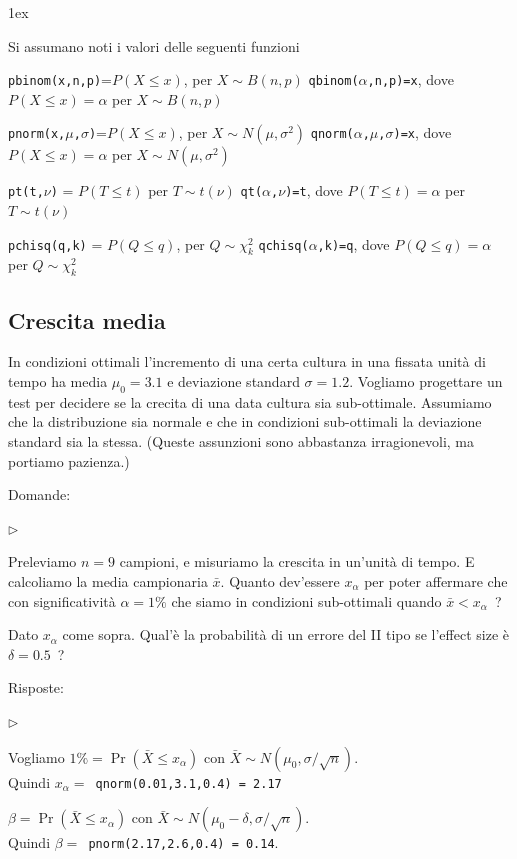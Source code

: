 \documentclass[11pt,openany]{book}
\newcommand{\mylabel}[1]{{\footnotesize\textsf{#1}}\hfill}
\renewenvironment{itemize}
  {\begin{list}{$\triangleright$}{%
   \setlength{\parskip}{0mm}
   \setlength{\topsep}{.2\baselineskip}
   \setlength{\rightmargin}{0mm}
   \setlength{\listparindent}{0mm}
   \setlength{\itemindent}{0mm}
   \setlength{\labelwidth}{3ex}
   \setlength{\itemsep}{.4\baselineskip}
   \setlength{\parsep}{0mm}
   \setlength{\partopsep}{0mm}
   \setlength{\labelsep}{1ex}
   \setlength{\leftmargin}{\labelwidth+\labelsep}
   \let\makelabel\mylabel}}{%
   \end{list}\vspace*{-1.3mm}}
\begin{document}
\parskip1ex
{\hrulefill\scriptsize

Si assumano noti i valori delle seguenti funzioni

{\tt pbinom(x,n,p)}=$P(X\le x)$, per $X\sim B(n,p)$
\hfill 
{\tt qbinom($\alpha$,n,p)=x},  dove $P(X\le x)=\alpha$ per $X\sim B(n,p)$

{\tt pnorm(x,$\mu$,$\sigma$)}=$P(X\le x)$, per $X\sim N(\mu,\sigma^2)$
\hfill 
{\tt qnorm($\alpha$,$\mu$,$\sigma$)=x},  dove $P(X\le x)=\alpha$ per $X\sim N(\mu,\sigma^2)$

{\tt pt(t,$\nu$)} = $P(T\le t)$ per $T\sim t(\nu)$
\hfill
{\tt qt($\alpha$,$\nu$)=t}, dove $P(T\le t)=\alpha$ per $T\sim t(\nu)$

{\tt pchisq(q,k)} = $P(Q\le q)$, per $Q\sim \chi^2_k$
\hfill
{\tt qchisq($\alpha$,k)=q},  dove $P(Q\le q)=\alpha$ per $Q\sim \chi^2_k$
\par
}



\hfill{}\clearpage\subsection{Crescita media}

In condizioni ottimali l'incremento di una certa cultura in una fissata unità di tempo ha media $\mu_0=3.1$ e deviazione standard $\sigma=1.2$. Vogliamo progettare un test per decidere se la crecita di una data cultura sia sub-ottimale. Assumiamo che la distribuzione sia normale e che in condizioni sub-ottimali la deviazione standard sia la stessa. (Queste assunzioni sono abbastanza irragionevoli, ma portiamo pazienza.)

Domande:

\begin{itemize}
\item[1] Preleviamo $n=9$ campioni, e misuriamo la crescita in un'unità di tempo. E calcoliamo la media campionaria $\bar x$. Quanto dev'essere $x_\alpha$ per poter affermare che con significatività $\alpha=1\%$ che siamo in condizioni sub-ottimali quando $\bar x<x_\alpha$~?
\item[2] Dato $x_\alpha$ come sopra. Qual'è la probabilità di un errore del II tipo se l'effect size è $\delta=0.5$~?
\end{itemize}

Risposte:

\begin{itemize}
\item[1] Vogliamo $1\%=\Pr(\bar X\le x_\alpha)$ con $\bar X\sim N(\mu_0,\sigma/\sqrt{n})$.\\
Quindi $x_\alpha=${\tt\ qnorm(0.01,3.1,0.4)\,=\,2.17}
\item[2] $\beta=\Pr(\bar X\le x_\alpha)$ con $\bar X\sim N(\mu_0-\delta,\sigma/\sqrt{n})$.\\
Quindi  $\beta=${\tt\ pnorm(2.17,2.6,0.4)\,=\,0.14}.

\end{itemize}
\end{document}
